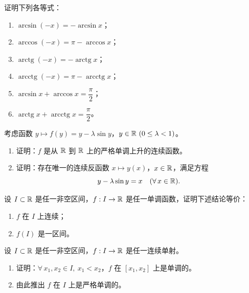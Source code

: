 \begin{exercise}
	\item 证明下列各等式：
	\begin{enumerate}[label=\arabic*)]
		\item \(\arcsin(-x)=-\arcsin x\)；
		\item \(\arccos(-x)=\pi-\arccos x\)；
		\item \(\operatorname{arctg}(-x)=-\operatorname{arctg}x\)；
		\item \(\operatorname{arcctg}(-x)=\pi-\operatorname{arcctg}x\)；
		\item \(\arcsin x+\arccos x=\dfrac\pi2\)；
		\item \(\operatorname{arctg}x+\operatorname{arcctg}x=\dfrac\pi2\)。
	\end{enumerate}
\end{exercise}

\begin{exercise}
	\item 考虑函数 \(y\longmapsto f(y)=y-\lambda\sin y\)，\(y\in\mathbb{R}\ (0\le\lambda<1)\)。
	\begin{enumerate}[label=\arabic*)]
		\item 证明：\(f\) 是从 \(\mathbb{R}\) 到 \(\mathbb{R}\) 上的严格单调上升的连续函数。
		\item 证明：存在唯一的连续反函数 \(x\longmapsto y(x)\)，\(x\in\mathbb{R}\)，满足方程
		\[
		y-\lambda\sin y=x\quad(\forall\,x\in\mathbb{R}).
		\]
	\end{enumerate}
\end{exercise}

\begin{exercise}
	\item 设 \(I\subset\mathbb{R}\) 是任一非空区间，\(f:I\to\mathbb{R}\) 是任一单调函数，证明下述结论等价：
	\begin{enumerate}[label=\arabic*)]
		\item \(f\) 在 \(I\) 上连续；
		\item \(f(I)\) 是一区间。
	\end{enumerate}
\end{exercise}

\begin{exercise}
	\item 设 \(I\subset\mathbb{R}\) 是任一非空区间，\(f:I\to\mathbb{R}\) 是任一连续单射。
	\begin{enumerate}[label=\arabic*)]
		\item 证明：\(\forall\,x_1,x_2\in I,\ x_1<x_2\)，\(f\) 在 \([x_1,x_2]\) 上是单调的。
		\item 由此推出 \(f\) 在 \(I\) 上是严格单调的。
	\end{enumerate}
\end{exercise}

